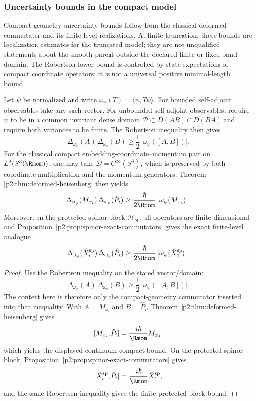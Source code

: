 \documentclass[12pt,a4paper]{article}
\begin{document}
\subsubsection{Uncertainty bounds in the compact model}
\label{p2:sec:gup}

Compact-geometry uncertainty bounds follow from the classical deformed
commutator and its finite-level realizations.  At finite truncation, these bounds are localization estimates for the truncated model; they are not unqualified statements about the smooth parent outside the declared finite or fixed-band domain.  The Robertson lower
bound is controlled by state expectations of compact coordinate operators; it
is not a universal positive minimal-length bound.

\begin{theorem}
\label{p2:thm:gup-general}
Let \(\psi\) be normalized and write
\(\omega_\psi(T)=\langle\psi,T\psi\rangle\).  For bounded self-adjoint
observables take any such vector.  For unbounded self-adjoint observables,
require \(\psi\) to lie in a common invariant dense domain
\(\mathcal D\subset D(AB)\cap D(BA)\) and require both variances to be finite.
The Robertson inequality \cite{Robertson1929} then gives
\[
\Delta_{\omega_\psi}(A)\,\Delta_{\omega_\psi}(B)
\ge
\frac12\,\bigl|\omega_\psi([A,B])\bigr|.
\]
For the classical compact embedding-coordinate--momentum pair on
\(L^2(S^3(\Rmom))\), one may take
\(\mathcal D=C^\infty(S^3)\), which is preserved by both coordinate
multiplication and the momentum generators.  Theorem~
\ref{p2:thm:deformed-heisenberg} then yields
\[
\Delta_{\omega_\psi}(M_{x_i})\,\Delta_{\omega_\psi}(\hat P_i)
\ge
\frac{\hbar}{2\Rmom}\,\bigl|\omega_\psi(M_{x_4})\bigr|.
\]
Moreover, on the protected spinor block $\mathcal H_{\mathrm{sp}}$, all operators are finite-dimensional and Proposition~\ref{p2:prop:spinor-exact-commutators} gives the exact finite-level analogue
\[
\Delta_{\omega_\psi}(\hat X_i^{\mathrm{sp}})\,
\Delta_{\omega_\psi}(\hat P_i)
\ge
\frac{\hbar}{2\Rmom}\,
\bigl|\omega_\psi(\hat X_4^{\mathrm{sp}})\bigr|.
\]
\end{theorem}

\begin{proof}
Use the Robertson inequality on the stated vector/domain:
\[
\Delta_{\omega_\psi}(A)\,\Delta_{\omega_\psi}(B)
\ge
\frac12\,\bigl|\omega_\psi([A,B])\bigr|.
\]
The content here is therefore only the compact-geometry commutator inserted into that inequality.  With
\(A=M_{x_i}\) and \(B=\hat P_i\), Theorem~\ref{p2:thm:deformed-heisenberg} gives
\[
[M_{x_i},\hat P_i]=\frac{i\hbar}{\Rmom}M_{x_4},
\]
which yields the displayed continuum compact bound.  On the protected spinor block,
Proposition~\ref{p2:prop:spinor-exact-commutators} gives
\[
[\hat X_i^{\mathrm{sp}},\hat P_i]=\frac{i\hbar}{\Rmom}\hat X_4^{\mathrm{sp}},
\]
and the same Robertson inequality gives the finite protected-block bound.
\end{proof}
\end{document}

